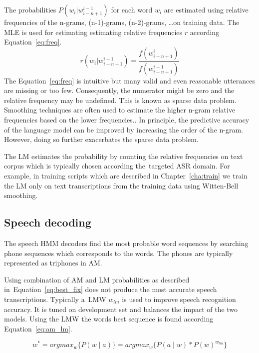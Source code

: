 The probabilities $P(w_i|w^{i-1}_{i-n+1})$ for each word $w_i$ are estimated using relative frequencies of the n-grams, (n-1)-grams, (n-2)-grams, \ldots on training data.
The \ac{MLE} is used for estimating estimating relative frequencies $r$ according Equation~\ref{eq:freq}.
\begin{equation} \label{eq:freq}
    r(w_i|w^{i-1}_{i-n+1}) = \frac{f(w^i_{i-n+1})} {f(w^{i-1}_{i-n+1})}
\end{equation}
The Equation~\ref{eq:freq} is intuitive but many valid and even reasonable utterances are missing or too few.
Consequently, the numerator might be zero and the relative frequency may be undefined.
This is known as sparse data problem.
Smoothing techniques are often used to estimate the higher n-gram relative frequencies based on the lower frequencies.\cite{goodman2001bit}.
In principle, the predictive accuracy of the language model can be improved by increasing the order of the n-gram.
However, doing so further exacerbates the sparse data problem.\cite{brants2007large}

The \ac{LM} estimates the probability by counting the relative frequencies on text corpus which is typically chosen according the~targeted \ac{ASR} domain.
For example, in training scripts which are described in Chapter~\ref{cha:train} we train the \ac{LM} only on text transcriptions from the training data using Witten-Bell smoothing.\cite{witten1991zero}


\subsection{Speech decoding}
\label{sub:decode}
The speech \ac{HMM} decoders find the most probable word sequences by searching phone sequences which corresponds to the words.
The phones are typically represented as triphones in \ac{AM}.

Using combination of \ac{AM} and \ac{LM} probabilities as described in~Equation~\ref{eq:best_fix} does not produce the most accurate speech transcriptions. 
Typically a~\ac{LMW} $w_{lm}$ is used to improve speech recognition accuracy.
It is tuned on development set and balances the impact of the two models.
Using the \ac{LMW} the words best sequence is found according Equation~\ref{eq:am_lm}.

\begin{equation}\label{eq:am_lm}
    w^* = argmax_{w}\{P(w \mid a)\} = argmax_{w}\{P(a \mid w) * P(w)^{w_{lm}}\}
\end{equation}

